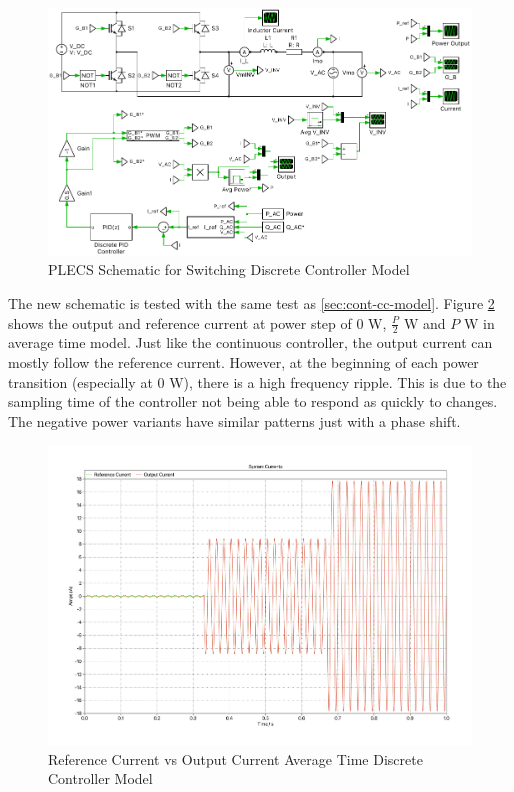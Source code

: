 \documentclass[12pt]{article}
\begin{document}
\begin{figure}[ht]
    \centering{}
    \includegraphics[width=\textwidth, height=0.4\textheight, keepaspectratio]{img/Switching Z-C Model.pdf}
    \caption{PLECS Schematic for Switching Discrete Controller Model}
    \label{fig:switching-z-c-model}
\end{figure}

The new schematic is tested with the same test as \ref{sec:cont-cc-model}.
Figure \ref{fig:avg-time-z-c-current} shows the output and reference current at power step of 0 W, $\frac{P}{2}$ W and $P$ W in average time model.
Just like the continuous controller, the output current can mostly follow the reference current.
However, at the beginning of each power transition (especially at 0 W), there is a high frequency ripple.
This is due to the sampling time of the controller not being able to respond as quickly to changes.
The negative power variants have similar patterns just with a phase shift.

\begin{figure}[ht]
    \centering{}
    \includegraphics[width=\textwidth, height=0.4\textheight, keepaspectratio]{img/Average Time Z-C Current.pdf}
    \caption{Reference Current vs Output Current Average Time Discrete Controller Model}
    \label{fig:avg-time-z-c-current}
\end{figure}
\end{document}
